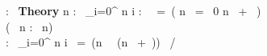 \def\sumonefn#1{{\sum_{i=0}^{#1} i}}%
\def\removetwofn#1#2{{#2 \setminus \{#1\}}}%
\def\addtwofn#1#2{{\{#1\} \cup #2}}%
\def\emptysetoneid#1{{\emptyset_#1}}%
\def\singletononefn#1{{\{ #1 \}}}%
\def\uniontwofn#1#2{{#1 \cup #2}}%
\def\differencetwofn#1#2{{#1 \setminus #2}}%
\setlength{\fboxsep}{1pt} 
\def\membertwofn#1#2{{#1 \in #2}}%
\setlength{\fboxsep}{1pt} 
 \begin{program} 
  :\mbox{ } \mbox{\large\bf Theory} \pvsnewline{}
\zi\zi {} \pvsnewline{}
 \pvsnewline{}
 n :\mbox{ }   \pvsnewline{}
 \pvsnewline{}
 \sumonefn { n } :\mbox{ }   \mbox{ }=\mbox{ }(\ii {} n \mbox{ }=\mbox{ }  0  n \mbox{ }+\mbox{ }\ii \sumonefn { n \mbox{ }-\mbox{ } 1 } ) \pvsnewline{}
\\[-\baselineskip]\oo\oo\oo\zi\zi\zi\zi\zi\zo\zo\zo {}(\ii \lambda\mbox{ } n :\mbox{ } n) \pvsnewline{}
\\[-\baselineskip]\oo\zi\zo\zo\zo \pvsnewline{}
  :\mbox{ }  \sumonefn { n } \mbox{ }=\mbox{ }\ii(\ii n \mbox{ }\times\mbox{ }\ii(\ii n \mbox{ }+\mbox{ })) \mbox{ }/\mbox{ } \pvsnewline{}
\\[-\baselineskip]\oo\oo\oo\oo\oo\oo\zi\zi\zi\zi\zi\zo\zo\zi\zo\zo\zo\zo \pvsnewline{}
   \pvsnewline{}
\zo \end{program}